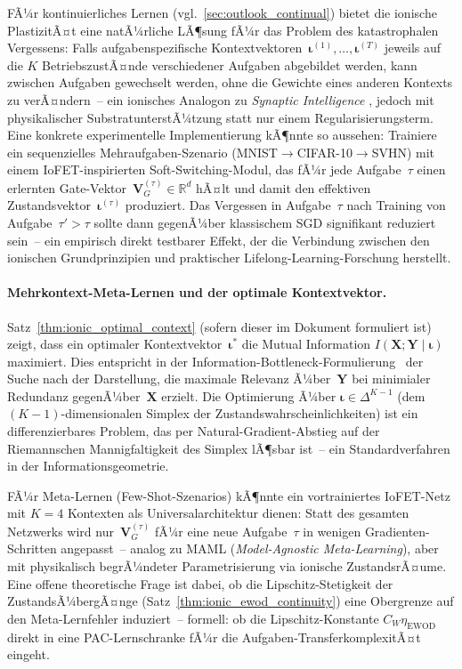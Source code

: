 ﻿\documentclass[12pt, a4paper, openany]{report}
\begin{document}
FÃ¼r kontinuierliches Lernen (vgl.~\cref{sec:outlook_continual}) bietet die
ionische PlastizitÃ¤t eine natÃ¼rliche LÃ¶sung fÃ¼r das Problem des katastrophalen
Vergessens: Falls aufgabenspezifische Kontextvektoren~$\bm{\iota}^{(1)}, \ldots,
\bm{\iota}^{(T)}$ jeweils auf die $K$ BetriebszustÃ¤nde verschiedener
Aufgaben abgebildet werden, kann zwischen Aufgaben gewechselt werden, ohne
die Gewichte eines anderen Kontexts zu verÃ¤ndern~-- ein ionisches Analogon
zu \emph{Synaptic Intelligence} \cite{zenke17}, jedoch mit physikalischer
SubstratunterstÃ¼tzung statt nur einem Regularisierungsterm.
Eine konkrete experimentelle Implementierung kÃ¶nnte so aussehen: Trainiere
ein sequenzielles Mehraufgaben-Szenario (MNIST$\to$CIFAR-10$\to$SVHN) mit
einem IoFET-inspirierten Soft-Switching-Modul, das fÃ¼r jede Aufgabe~$\tau$
einen erlernten Gate-Vektor~$\mathbf{V}_G^{(\tau)} \in \mathbb{R}^d$ hÃ¤lt
und damit den effektiven Zustandsvektor~$\bm{\iota}^{(\tau)}$ produziert.
Das Vergessen in Aufgabe~$\tau$ nach Training von Aufgabe~$\tau'>\tau$ sollte
dann gegenÃ¼ber klassischem SGD signifikant reduziert sein~-- ein empirisch
direkt testbarer Effekt, der die Verbindung zwischen den
ionischen Grundprinzipien und praktischer Lifelong-Learning-Forschung herstellt.

\paragraph{Mehrkontext-Meta-Lernen und der optimale Kontextvektor.}
Satz~\ref{thm:ionic_optimal_context} (sofern dieser im Dokument formuliert
ist) zeigt, dass ein optimaler Kontextvektor~$\bm{\iota}^*$
die Mutual Information $I(\bm{X};\bm{Y} \mid \bm{\iota})$ maximiert.  Dies
entspricht in der Information-Bottleneck-Formulierung~\cite{tishby15} der
Suche nach der Darstellung, die maximale Relevanz Ã¼ber~$\bm{Y}$ bei
minimialer Redundanz gegenÃ¼ber~$\bm{X}$ erzielt.  Die Optimierung Ã¼ber
$\bm{\iota} \in \Delta^{K-1}$ (dem $(K-1)$-dimensionalen Simplex der
Zustandswahrscheinlichkeiten) ist ein differenzierbares Problem, das
per Natural-Gradient-Abstieg auf der Riemannschen Mannigfaltigkeit des
Simplex lÃ¶sbar ist~-- ein Standardverfahren in der Informationsgeometrie.

FÃ¼r Meta-Lernen (Few-Shot-Szenarios) kÃ¶nnte ein vortrainiertes IoFET-Netz
mit $K=4$ Kontexten als Universalarchitektur dienen: Statt des gesamten
Netzwerks wird nur~$\bm{V}_G^{(\tau)}$ fÃ¼r eine neue Aufgabe~$\tau$
in wenigen Gradienten-Schritten angepasst~-- analog zu MAML
(\textit{Model-Agnostic Meta-Learning}), aber mit physikalisch begrÃ¼ndeter
Parametrisierung via ionische ZustandsrÃ¤ume.  Eine offene
theoretische Frage ist dabei, ob die Lipschitz-Stetigkeit der
ZustandsÃ¼bergÃ¤nge (Satz~\ref{thm:ionic_ewod_continuity}) eine Obergrenze
auf den Meta-Lernfehler induziert~-- formell: ob die Lipschitz-Konstante
$C_W \eta_{\text{EWOD}}$ direkt in eine PAC-Lernschranke fÃ¼r die
Aufgaben-TransferkomplexitÃ¤t eingeht.
\end{document}
